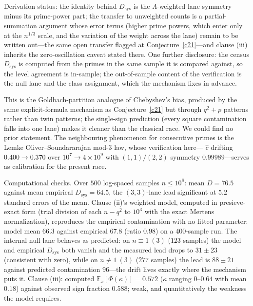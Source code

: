 \documentclass[11pt]{article}
\theoremstyle{definition}
\begin{document}
Derivation status: the identity behind $D_{\mathrm{sys}}$ is the
$\Lambda$-weighted lane symmetry minus its prime-power part; the
transfer to unweighted counts is a partial-summation argument whose
error terms (higher prime powers, which enter only at the $n^{1/3}$
scale, and the variation of the weight across the lane) remain to be
written out---the same open transfer flagged at
Conjecture~\ref{c21}---and clause (iii) inherits the zero-oscillation caveat stated there.  One further disclosure: the census $D_{\mathrm{sys}}$ is computed from the primes in the same sample it is compared against, so the level agreement is in-sample; the out-of-sample content of the verification is the null lane and the class assignment, which the mechanism fixes in advance.

This is the Goldbach-partition analogue of Chebyshev's bias, produced
by the same explicit-formula mechanism as Conjecture~\ref{c21} but
through $q^2+p$ patterns rather than twin patterns; the single-sign
prediction (every square contamination falls into one lane) makes it
cleaner than the classical race.  We could find no prior statement.
The neighbouring phenomenon for consecutive primes is the Lemke
Oliver--Soundararajan mod-3 law, whose verification here---%
$\hat c$ drifting $0.400\to0.370$ over $10^7\!\to\!4\times10^9$ with
$(1,1)/(2,2)$ symmetry $0.99989$---serves as calibration for the
present race.

Computational checks.  Over $500$ log-spaced samples $n\le10^8$: mean
$D=76.5$ against mean empirical $D_{\mathrm{sys}}=64.5$, the
$(3,3)$-lane lead significant at $5.2$ standard errors of the mean.
Clause (ii)'s weighted model, computed in presieve-exact form
(trial division of each $n-q^2$ to $10^3$ with the exact Mertens
normalization), reproduces the empirical contamination with no fitted
parameter: model mean $66.3$ against empirical $67.8$ (ratio
$0.98$) on a $400$-sample run.  The internal null lane behaves as
predicted: on $n\equiv1\ (3)$ ($123$ samples) the model and empirical
$D_{\mathrm{sys}}$ both vanish and the measured lead drops to
$31\pm23$ (consistent with zero), while on $n\not\equiv1\ (3)$
($277$ samples) the lead is $88\pm21$ against predicted
contamination $96$---the drift lives exactly where the mechanism puts
it.  Clause (iii): computed $\mathbb E_x[\Phi(\kappa)]=0.572$
($\kappa$ ranging $0$--$0.64$ with mean $0.18$) against observed sign
fraction $0.588$; weak, and quantitatively the weakness the model
requires.
\end{document}

